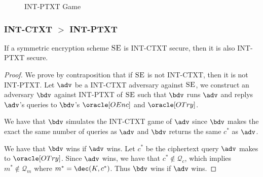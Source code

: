 \documentclass[11pt,a4paper]{article}
\newcommand{\SE}{\textsc{SE}}
\begin{document}
\begin{figure}[H]
\begin{pchstack}[ center , boxed, space=0.5cm]

\begin{pcvstack}[space = 0.3cm]
	
\end{pcvstack}
\end{pchstack}
\caption{INT-PTXT Game}
\label{fig:int-ptxt-game}
\end{figure}



\subsubsection{INT-CTXT $>$ INT-PTXT} If a symmetric encryption scheme $\SE$ is INT-CTXT secure, then it is also INT-PTXT secure. 

\begin{proof}
We prove by contraposition that if $\SE$ is not INT-CTXT, then it is not INT-PTXT. Let $\adv$ be a INT-CTXT adversary against $\SE$, we construct an adversary $\bdv$ against INT-PTXT of $\SE$ such that $\bdv$ runs $\adv$ and replys $\adv$'s queries to $\bdv$'s $\oracle[OEnc]$ and $\oracle[OTry]$. 

We have that $\bdv$ simulates the INT-CTXT game of $\adv$ since $\bdv$ makes the exact the same number of queries as $\adv$ and $\bdv$ returns the same $c^*$ as $\adv$. 

We have that $\bdv$ wins if $\adv$ wins. Let $c^*$ be the ciphertext query $\adv$ makes to $\oracle[OTry]$. Since $\adv$ wins, we have that $c^* \not\in \mathcal{Q}_c$, which implies $m^* \not\in \mathcal{Q}_m$ where $m^* = \dec(K, c^*)$. Thus $\bdv$ wins if $\adv$ wins. 

\end{proof}
\end{document}
